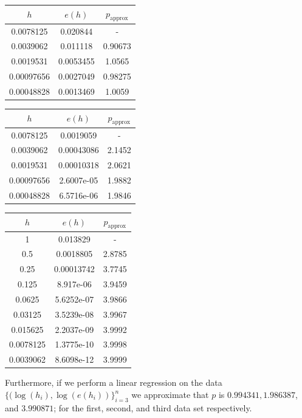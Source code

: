 \documentclass[12pt]{article}
\begin{document}
\begin{center}
	\begin{tabular}{|c|c|c|}
		\hline
		$h$&$e(h)$&$p_\text{approx}$\\ \hline
		0.0078125&0.020844&-\\ \hline
		0.0039062&0.011118&0.90673\\ \hline
		0.0019531&0.0053455&1.0565\\ \hline
		0.00097656&0.0027049&0.98275\\ \hline
		0.00048828&0.0013469&1.0059\\ \hline
	\end{tabular}
\end{center}
\begin{center}
	\begin{tabular}{|c|c|c|}
		\hline
		$h$&$e(h)$&$p_\text{approx}$\\ \hline
		0.0078125&0.0019059&-\\ \hline
		0.0039062&0.00043086&2.1452\\ \hline
		0.0019531&0.00010318&2.0621\\ \hline
		0.00097656&2.6007e-05&1.9882\\ \hline
		0.00048828&6.5716e-06&1.9846\\ \hline
	\end{tabular}
\end{center}
\begin{center}
	\begin{tabular}{|c|c|c|}
		\hline
		$h$&$e(h)$&$p_\text{approx}$\\ \hline
		1&0.013829&-\\ \hline
		0.5&0.0018805&2.8785\\ \hline
		0.25&0.00013742&3.7745\\ \hline
		0.125&8.917e-06&3.9459\\ \hline
		0.0625&5.6252e-07&3.9866\\ \hline
		0.03125&3.5239e-08&3.9967\\ \hline
		0.015625&2.2037e-09&3.9992\\ \hline
		0.0078125&1.3775e-10&3.9998\\ \hline
		0.0039062&8.6098e-12&3.9999\\ \hline
	\end{tabular}
\end{center}

Furthermore, if we perform a linear regression on the data $\{(\log(h_i), \log(e(h_i))\}_{i=3}^n$ we approximate that $p$ is $0.994341, 1.986387$, and $3.990871$; for the first, second, and third data set respectively. \bigbreak
\end{document}
